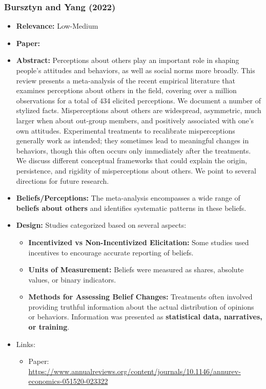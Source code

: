 \documentclass[a4paper, 12pt]{article}
\begin{document}
\subsubsection*{Bursztyn and Yang (2022)}
\begin{itemize}
    \item \textbf{Relevance:} Low-Medium
    \item \textbf{Paper:} 
    \item \textbf{Abstract:} Perceptions about others play an important role in shaping people’s attitudes and behaviors, as well as social norms more broadly. This review presents a meta-analysis of the recent empirical literature that examines perceptions about others in the field, covering over a million observations for a total of 434 elicited perceptions. We document a number of stylized facts. Misperceptions about others are widespread, asymmetric, much larger when about out-group members, and positively associated with one’s own attitudes. Experimental treatments to recalibrate misperceptions generally work as intended; they sometimes lead to meaningful changes in behaviors, though this often occurs only immediately after the treatments. We discuss different conceptual frameworks that could explain the origin, persistence, and rigidity of misperceptions about others. We point to several directions for future research.
    \item \textbf{Beliefs/Perceptions:} The meta-analysis encompasses a wide range of \textbf{beliefs about others} and identifies systematic patterns in these beliefs.
    \item \textbf{Design:} Studies categorized based on several aspects:
    \begin{itemize}
        \item \textbf{Incentivized vs Non-Incentivized Elicitation:} Some studies used incentives to encourage accurate reporting of beliefs.
        \item \textbf{Units of Measurement:} Beliefs were measured as shares, absolute values, or binary indicators.
        \item \textbf{Methods for Assessing Belief Changes:} Treatments often involved providing truthful information about the actual distribution of opinions or behaviors. Information was presented as \textbf{statistical data, narratives, or training}.
    \end{itemize}
    \item Links: 
    \begin{itemize}
        \item Paper: \url{https://www.annualreviews.org/content/journals/10.1146/annurev-economics-051520-023322}
    \end{itemize}
\end{itemize}
\end{document}
